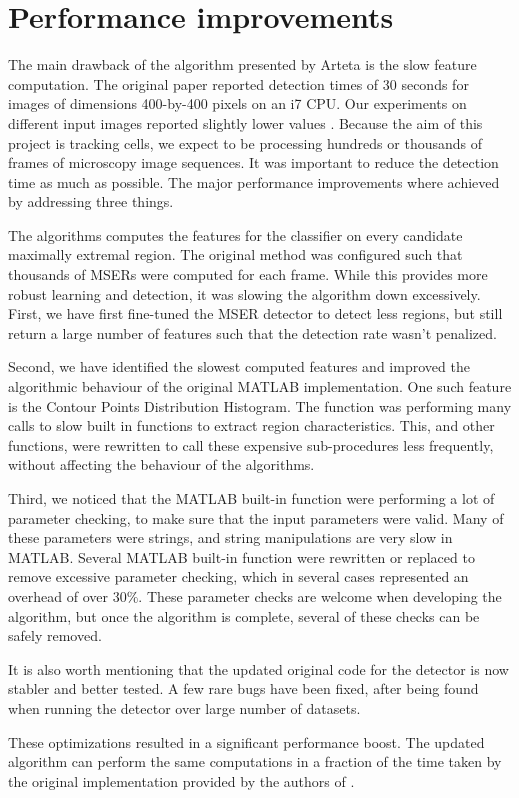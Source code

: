 	\section{Performance improvements \statusfirstdraft}
	\label{sec:detector_changes}
		The main drawback of the algorithm presented by Arteta \cite{arteta12} is the slow feature computation. The original paper reported detection times of 30 seconds for images of dimensions 400-by-400 pixels on an i7 CPU. Our experiments on different input images reported slightly lower values . Because the aim of this project is tracking cells, we expect to be processing hundreds or thousands of frames of microscopy image sequences. It was important to reduce the detection time as much as possible. The major performance improvements where achieved by addressing three things.
		
		The algorithms computes the features for the classifier on every candidate maximally extremal region. The original method was configured such that thousands of MSERs were computed for each frame. While this provides more robust learning and detection, it was slowing the algorithm down excessively. First, we have first fine-tuned the MSER detector to detect less regions, but still return a large number of features such that the detection rate wasn't penalized.
		
		Second, we have identified the slowest computed features and improved the algorithmic behaviour of the original MATLAB implementation. One such feature is the Contour Points Distribution Histogram. The function was performing many calls to slow built in functions to extract region characteristics. This, and other functions, were rewritten to call these expensive sub-procedures less frequently, without affecting the behaviour of the algorithms.
		
		Third, we noticed that the MATLAB built-in function were performing a lot of parameter checking, to make sure that the input parameters were valid. Many of these parameters were strings, and string manipulations are very slow in MATLAB. Several MATLAB built-in function were rewritten or replaced to remove excessive parameter checking, which in several cases represented an overhead of over $30\%$. These parameter checks are welcome when developing the algorithm, but once the algorithm is complete, several of these checks can be safely removed.
		
		It is also worth mentioning that the updated original code for the detector is now stabler and better tested. A few rare bugs have been fixed, after being found when running the detector over large number of datasets.
		
		These optimizations resulted in a significant performance boost. The updated algorithm can perform the same computations in a fraction of the time taken by the original implementation provided by the authors of \cite{arteta12}.
	